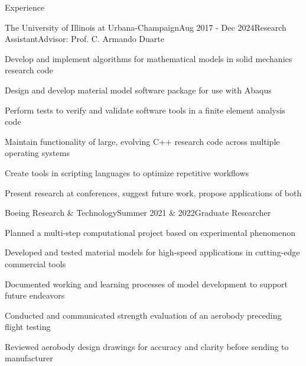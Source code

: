 \documentclass{resume} %
\begin{document}

\begin{rSection}{Experience}

\begin{rSubsection}{The University of Illinois at Urbana-Champaign}{Aug 2017 - Dec 2024}{Research Assistant}{Advisor: Prof. C. Armando Duarte}
\item Develop and implement algorithms for mathematical models in solid mechanics research code
\item Design and develop material model software package for use with Abaqus
\item Perform tests to verify and validate software tools in a finite element analysis code
\item Maintain functionality of large, evolving C++ research code across multiple operating systems
\item Create tools in scripting languages to optimize repetitive workflows
\item Present research at conferences, suggest future work, propose applications of both
\end{rSubsection}


\begin{rSubsection}{Boeing Research \& Technology}{Summer 2021  \& 2022}{Graduate Researcher}{}
%
\item Planned a multi-step computational project based on experimental phenomenon
\item Developed and tested material models for high-speed applications in cutting-edge commercial tools
\item Documented working and learning processes of model development to support future endeavors
\item Conducted and communicated strength evaluation of an aerobody preceding flight testing
\item Reviewed aerobody design drawings for accuracy and clarity before sending to manufacturer
\end{rSubsection}


\end{rSection}
\end{document}
